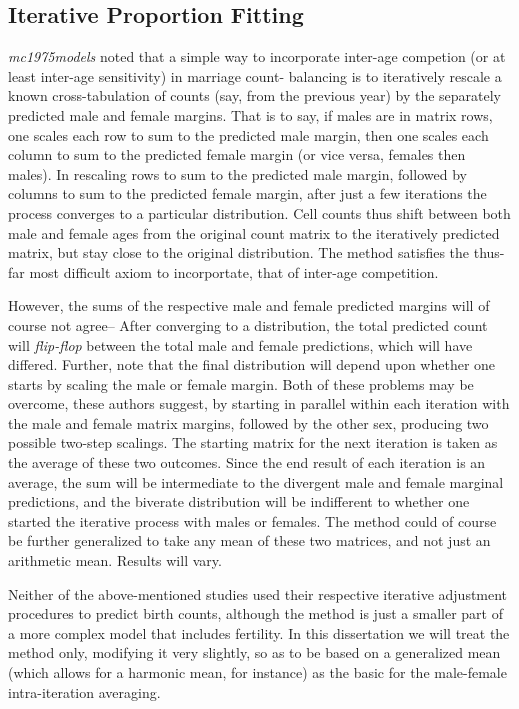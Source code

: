 \subsection{Iterative Proportion Fitting}

\textit{mc1975models} noted that a simple way to incorporate inter-age
competion (or at least inter-age sensitivity) in marriage count- balancing is
to iteratively rescale a known cross-tabulation of counts (say, from the
previous year) by the separately predicted male and female margins. That is to
say, if males are in matrix rows, one scales each row to sum to the predicted
male margin, then one scales each column to sum to the predicted female margin
(or vice versa, females then males). In rescaling rows to sum to the predicted male margin, 
followed by columns to sum to the predicted female margin, after just a few iterations the process
converges to a particular distribution. Cell counts thus shift between both male
and female ages from the original count matrix to the iteratively predicted
matrix, but stay close to the original distribution. The method satisfies the
thus-far most difficult axiom to incorportate, that of inter-age competition. 

However, the sums of the respective male and female predicted margins will of
course not agree-- After converging to a distribution, the total predicted count
will \textit{flip-flop} between the total male and female predictions, 
which will have differed. Further, \citet{Matthews2013} note that the
final distribution will depend upon whether one starts by scaling the male or
female margin. Both of these problems may be overcome, these authors suggest, 
by starting in parallel within each iteration with the male and female matrix
margins, followed by the other sex, producing two possible two-step scalings.
The starting matrix for the next iteration is taken as the average of these two
outcomes. Since the end result of each iteration is an average, the sum will be
intermediate to the divergent male and female marginal predictions, and the
biverate distribution will be indifferent to whether one started the iterative
process with males or females. The method could of course be further generalized
to take any mean of these two matrices, and not just an arithmetic mean. Results
will vary.

Neither of the above-mentioned studies used their respective iterative
adjustment procedures to predict birth counts, although the \citet{Matthews2013}
method is just a smaller part of a more complex model that includes fertility.
In this dissertation we will treat the \citet{Matthews2013} method only,
modifying it very slightly, so as to be based on a generalized mean (which
allows for a harmonic mean, for instance) as the basic for the male-female
intra-iteration averaging.



